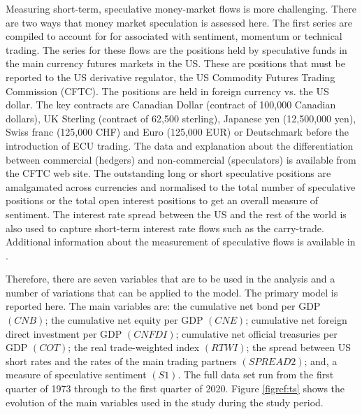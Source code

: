 \documentclass[jrfm,article,accept,moreauthors,pdftex]{Definitions/mdpi}
\begin{document}
Measuring short-term, speculative money-market flows is more challenging.  There are two ways that money market speculation is assessed here.  The first series are compiled to account for for associated with sentiment, momentum or technical trading.  The series for these flows are the positions held by speculative funds in the main currency futures markets in the US.  These are positions that must be reported to the US derivative regulator, the US Commodity Futures Trading Commission (CFTC).  The positions are held in foreign currency vs. the US dollar.  The key contracts are Canadian Dollar (contract of 100,000 Canadian dollars), UK Sterling (contract of 62,500 sterling), Japanese yen (12,500,000 yen), Swiss franc (125,000 CHF) and Euro (125,000 EUR) or Deutschmark before the introduction of ECU trading.  The data and explanation about the differentiation between commercial (hedgers) and non-commercial (speculators) is available from the CFTC web site.   The outstanding long or short speculative positions are amalgamated across currencies and normalised to the total number of speculative positions or the total open interest positions to get an overall measure of sentiment.  The interest rate spread between the US and the rest of the world is also used to capture short-term interest rate flows such as the {carry-trade}. Additional information about the measurement of speculative flows is available in \mbox{\citep{HaywardEvent}}. 

Therefore, there are seven variables that are to be used in the analysis and a number of variations that can be applied to the model. The primary model is reported here. The main variables are:  the cumulative net bond per GDP $(CNB)$; the cumulative net equity per GDP $(CNE)$; cumulative net foreign direct investment per GDP $(CNFDI)$; cumulative net official treasuries per GDP $(COT)$; the real trade-weighted index $(RTWI)$;  the spread between US short rates and the rates of the main trading partners $(SPREAD2)$; and, a measure of speculative sentiment $(S1)$. The full data set run from the first quarter of 1973 through to the first quarter of 2020.  Figure \ref{figref:ts} shows the evolution of the main variables used in the study during the study period. 
\end{document}
